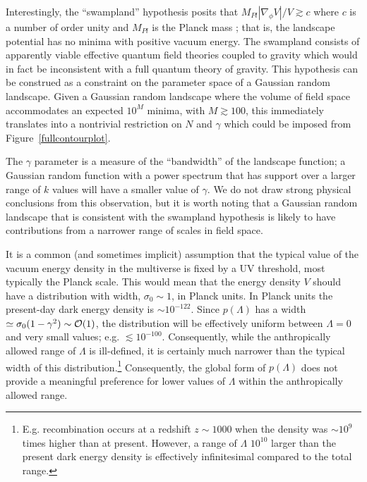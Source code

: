 \documentclass[12pt]{article}
\begin{document}
Interestingly, the ``swampland'' hypothesis posits that $M_{Pl} |\nabla_\phi V|/ V \gtrsim c$ where $c$ is a number of order unity and $M_{Pl}$ is the Planck mass \cite{Agrawal2018,Ooguri:2018wrx}; that is, the landscape potential has no minima with  positive vacuum energy. The swampland consists of apparently viable effective quantum field theories coupled to gravity which would in fact be inconsistent with a full quantum theory of gravity. This hypothesis can be construed as a constraint on the parameter space of a Gaussian random landscape. Given a Gaussian random landscape where the volume of field space accommodates an expected $10^{M}$ minima, with $M\gtrsim 100$, this immediately translates into a nontrivial restriction on $N$ and $\gamma$ which could be imposed from  Figure~\ref{fullcontourplot}. 

The $\gamma$  parameter is a measure of the ``bandwidth'' of the landscape function; a Gaussian random function with a power spectrum that has support over a larger range of $k$ values will have a smaller value of $\gamma$. We do not draw strong physical conclusions from this observation, but it is worth noting that a Gaussian random landscape that is consistent with the swampland hypothesis is likely to have contributions from a narrower range of scales in field space.  
 
 It is a common (and sometimes implicit) assumption that the typical value of the vacuum energy density in the multiverse is  fixed by a UV threshold, most typically the Planck scale. This would mean that the energy density $V$ should have a distribution with width, $\sigma_0 \sim 1$, in Planck units. In Planck units the present-day dark energy density is $\sim 10^{-122}$. Since $p(\Lambda)$  has a width $\simeq \sigma_0 (1-\gamma^2)\sim{\cal{O}}(1)$, the distribution will be effectively uniform between $\Lambda=0$ and very small values; e.g. $\lesssim 10^{-100}$. Consequently, while the anthropically allowed range of $\Lambda$ is ill-defined, it is certainly much narrower than the typical width of this distribution.\footnote{E.g. recombination occurs at a redshift $z\sim 1000$ when the density was $\sim 10^9$ times higher than at present. However, a range of $\Lambda$  $10^{10}$ larger than the present dark energy density is effectively infinitesimal compared to the total range.} Consequently, the global form of $p(\Lambda)$ does not provide a meaningful preference for lower values of $\Lambda$ within the anthropically allowed range. 
\end{document}
